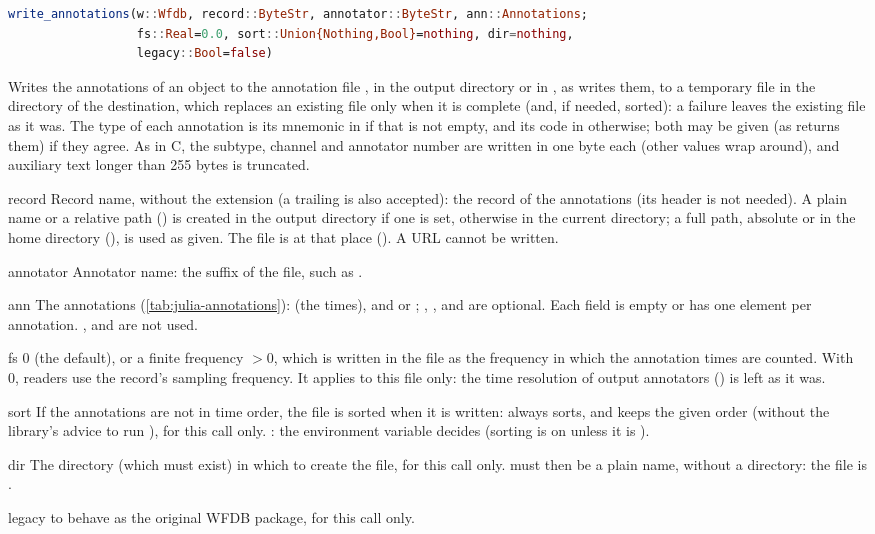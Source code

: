 \begin{lstlisting}[language=Julia,style=signature]
write_annotations(w::Wfdb, record::ByteStr, annotator::ByteStr, ann::Annotations;
                  fs::Real=0.0, sort::Union{Nothing,Bool}=nothing, dir=nothing,
                  legacy::Bool=false)
\end{lstlisting}
Writes the annotations of an  object to the annotation file
, in the output directory or in , as 
writes them, to a temporary file in the directory of the destination, which replaces an
existing file only when it is complete (and, if needed, sorted): a failure leaves the
existing file as it was. The type of each annotation is its mnemonic
in  if that is not empty, and its code in  otherwise;
both may be given (as  returns them) if they agree. As in C, the
subtype, channel and annotator number are written in one byte each (other values wrap
around), and auxiliary text longer than 255 bytes is truncated.
\begin{params}
\item[record] Record name, without the  extension (a trailing 
  is also accepted): the record of the annotations (its header is not needed). A plain
  name or a relative path () is created in the output directory if one
  is set, otherwise in the current directory; a full path, absolute or in the home
  directory (), is used as given. The file is
   at that place (). A URL cannot be
  written.
\item[annotator] Annotator name: the suffix of the file, such as .
\item[ann] The annotations (\cref{tab:julia-annotations}):  (the times),
  and  or ; , ,  and
   are optional. Each field is empty or has one element per annotation.
  ,  and  are not used.
\item[fs] 0 (the default), or a finite frequency $> 0$, which is written in the file as
  the frequency in which the annotation times are counted. With 0, readers use the
  record's sampling frequency. It applies to this file only: the time resolution of
  output annotators () is left as it was.
\item[sort] If the annotations are not in time order, the file is sorted when it is
  written:  always sorts, and  keeps the given order (without the
  library's advice to run ), for this call only. : the
  environment variable  decides (sorting is on unless it is ).
\item[dir] The directory (which must exist) in which to create the file, for this call
  only.  must then be a plain name, without a directory: the file is
  .
\item[legacy]  to behave as the original WFDB package, for this call only.
\end{params}
